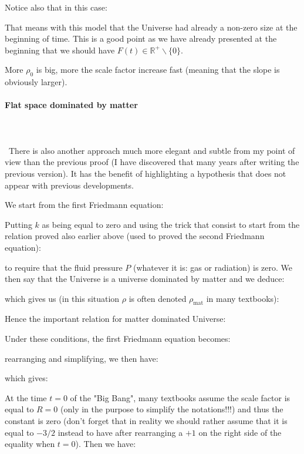 	Notice also that in this case:
	
	That means with this model that the Universe had already a non-zero size at the beginning of time. This is a good point as we have already presented at the beginning that we should have $F(t)\in \mathbb{R}^+\backslash\{0\}$.
	\begin{tcolorbox}[title=Remark,colframe=black,arc=10pt]
	More $\rho_0$ is big, more the scale factor increase fast (meaning that the slope is obviously larger).
	\end{tcolorbox}
	
	\pagebreak
	\paragraph{Flat space dominated by matter}\mbox{}\\\\\
	There is also another approach much more elegant and subtle from my point of view than the previous proof (I have discovered that many years after writing the previous version). It has the benefit of highlighting a hypothesis that does not appear with previous developments.

	We start from the first Friedmann equation:
	
	Putting $k$ as being equal to zero and using the trick that consist to start from the relation proved also earlier above (used to proved the second Friedmann equation):
	
	to require that the fluid pressure $P$ (whatever it is: gas or radiation) is zero. We then say that the Universe is a universe dominated by matter and we deduce:
	
	which gives us (in this situation $\rho$ is often denoted $\rho_{\text{mat}}$ in many textbooks):
	
	Hence the important relation for matter dominated Universe:
	
	Under these conditions, the first Friedmann equation becomes:
	
	rearranging and simplifying, we then have:
	
	which gives:
	
	At the time $t=0$ of the "Big Bang", many textbooks assume the scale factor is equal to $R=0$ (only in the purpose to simplify the notations!!!) and thus the constant is zero (don't forget that in reality we should rather assume that it is equal to $-3/2$ instead to have after rearranging a $+1$ on the right side of the equality when $t=0$). Then we have:
	
